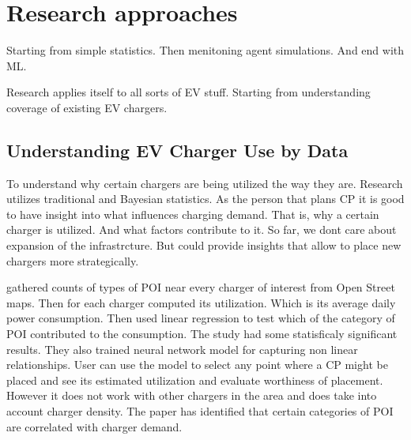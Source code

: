 \section{Research approaches}


Starting from simple statistics. Then menitoning agent simulations. And end with ML.

Research applies itself to all sorts of EV stuff. Starting from understanding coverage of existing EV chargers.

\subsection{Understanding EV Charger Use by Data}

To understand why certain chargers are being utilized the way they are. Research utilizes traditional and Bayesian statistics. As the person that plans \acrfull{CP} it is good to have insight into what influences charging demand. That is, why a certain charger is utilized. And what factors contribute to it. So far, we dont care about expansion of the infrastrcture. But could provide insights that allow to place new chargers more strategically.

 gathered counts of types of \acrfull{POI} near every charger of interest  from Open Street maps. Then for each charger computed its utilization. Which is its average daily power consumption. Then used linear regression to test which of the category of \acrfull{POI} contributed to the consumption.
The study had some statisficaly significant results. They also trained neural network model for capturing non linear relationships. User can use the model to select any point where a \acrfull{CP} might be placed and see its estimated utilization and evaluate worthiness of placement. However it does not work with other chargers in the area and does take into account charger density. The paper has identified that certain categories of \acrfull{POI} are correlated with charger demand.

